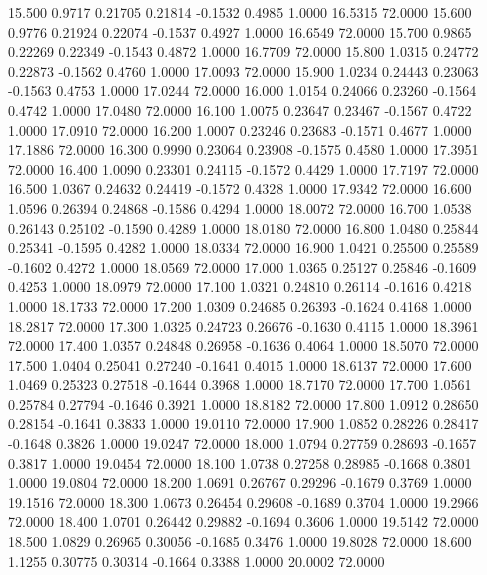   15.500   0.9717   0.21705   0.21814  -0.1532   0.4985   1.0000  16.5315  72.0000
  15.600   0.9776   0.21924   0.22074  -0.1537   0.4927   1.0000  16.6549  72.0000
  15.700   0.9865   0.22269   0.22349  -0.1543   0.4872   1.0000  16.7709  72.0000
  15.800   1.0315   0.24772   0.22873  -0.1562   0.4760   1.0000  17.0093  72.0000
  15.900   1.0234   0.24443   0.23063  -0.1563   0.4753   1.0000  17.0244  72.0000
  16.000   1.0154   0.24066   0.23260  -0.1564   0.4742   1.0000  17.0480  72.0000
  16.100   1.0075   0.23647   0.23467  -0.1567   0.4722   1.0000  17.0910  72.0000
  16.200   1.0007   0.23246   0.23683  -0.1571   0.4677   1.0000  17.1886  72.0000
  16.300   0.9990   0.23064   0.23908  -0.1575   0.4580   1.0000  17.3951  72.0000
  16.400   1.0090   0.23301   0.24115  -0.1572   0.4429   1.0000  17.7197  72.0000
  16.500   1.0367   0.24632   0.24419  -0.1572   0.4328   1.0000  17.9342  72.0000
  16.600   1.0596   0.26394   0.24868  -0.1586   0.4294   1.0000  18.0072  72.0000
  16.700   1.0538   0.26143   0.25102  -0.1590   0.4289   1.0000  18.0180  72.0000
  16.800   1.0480   0.25844   0.25341  -0.1595   0.4282   1.0000  18.0334  72.0000
  16.900   1.0421   0.25500   0.25589  -0.1602   0.4272   1.0000  18.0569  72.0000
  17.000   1.0365   0.25127   0.25846  -0.1609   0.4253   1.0000  18.0979  72.0000
  17.100   1.0321   0.24810   0.26114  -0.1616   0.4218   1.0000  18.1733  72.0000
  17.200   1.0309   0.24685   0.26393  -0.1624   0.4168   1.0000  18.2817  72.0000
  17.300   1.0325   0.24723   0.26676  -0.1630   0.4115   1.0000  18.3961  72.0000
  17.400   1.0357   0.24848   0.26958  -0.1636   0.4064   1.0000  18.5070  72.0000
  17.500   1.0404   0.25041   0.27240  -0.1641   0.4015   1.0000  18.6137  72.0000
  17.600   1.0469   0.25323   0.27518  -0.1644   0.3968   1.0000  18.7170  72.0000
  17.700   1.0561   0.25784   0.27794  -0.1646   0.3921   1.0000  18.8182  72.0000
  17.800   1.0912   0.28650   0.28154  -0.1641   0.3833   1.0000  19.0110  72.0000
  17.900   1.0852   0.28226   0.28417  -0.1648   0.3826   1.0000  19.0247  72.0000
  18.000   1.0794   0.27759   0.28693  -0.1657   0.3817   1.0000  19.0454  72.0000
  18.100   1.0738   0.27258   0.28985  -0.1668   0.3801   1.0000  19.0804  72.0000
  18.200   1.0691   0.26767   0.29296  -0.1679   0.3769   1.0000  19.1516  72.0000
  18.300   1.0673   0.26454   0.29608  -0.1689   0.3704   1.0000  19.2966  72.0000
  18.400   1.0701   0.26442   0.29882  -0.1694   0.3606   1.0000  19.5142  72.0000
  18.500   1.0829   0.26965   0.30056  -0.1685   0.3476   1.0000  19.8028  72.0000
  18.600   1.1255   0.30775   0.30314  -0.1664   0.3388   1.0000  20.0002  72.0000
